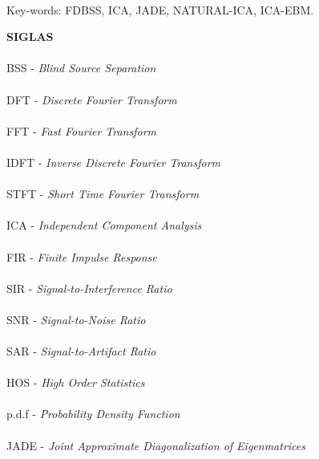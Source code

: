 \paragraph{}
\noindent Key-words: FDBSS, ICA, JADE, NATURAL-ICA, ICA-EBM.

\pagebreak


\begin{center}
\textbf{SIGLAS}
\end{center}
      \vspace{0.5cm}

\paragraph{}BSS  - \textit{Blind Source Separation}
\paragraph{}DFT  - \textit{Discrete Fourier Transform}
\paragraph{}FFT  - \textit{Fast Fourier Transform}
\paragraph{}IDFT  - \textit{Inverse Discrete Fourier Transform}
\paragraph{}STFT - \textit{Short Time Fourier Transform}
\paragraph{}ICA  - \textit{Independent Component Analysis}
\paragraph{}FIR  - \textit{Finite Impulse Response}
\paragraph{}SIR  - \textit{Signal-to-Interference Ratio}
\paragraph{}SNR  - \textit{Signal-to-Noise Ratio}
\paragraph{}SAR  - \textit{Signal-to-Artifact Ratio}
\paragraph{}HOS  - \textit{High Order Statistics}
\paragraph{}p.d.f  - \textit{Probability Density Function}
\paragraph{}JADE  - \textit{Joint Approximate Diagonalization of Eigenmatrices}
\pagebreak







